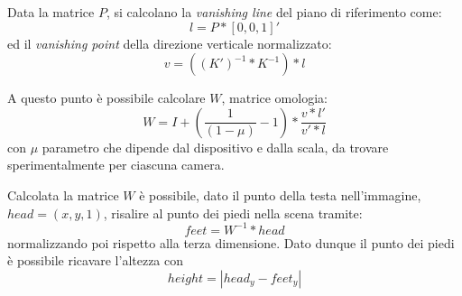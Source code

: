 Data la matrice $P$, si calcolano la \emph{vanishing line} del piano di riferimento come:
\begin{equation}
l = P * [0, 0, 1]'
\end{equation}
ed il \emph{vanishing point} della direzione verticale normalizzato:
\begin{equation}
v = ((K')^{-1} * K^{-1}) * l
\end{equation}

A questo punto è possibile calcolare $W$, matrice omologia:
\begin{equation}
W = I + (\frac{1}{(1 - \mu)} - 1) * \frac{v * l'}{v' * l}
\end{equation}
con $\mu$ parametro che dipende dal dispositivo e dalla scala, da trovare sperimentalmente per ciascuna camera.

Calcolata la matrice $W$ è possibile, dato il punto della testa nell'immagine, $head = (x, y, 1)$, risalire al punto dei piedi nella scena tramite:
\begin{equation}
feet = W^{-1} * head
\end{equation}
normalizzando poi rispetto alla terza dimensione. Dato dunque il punto dei piedi è possibile ricavare l'altezza con
\begin{equation}
height = |head_y - feet_y|
\end{equation}